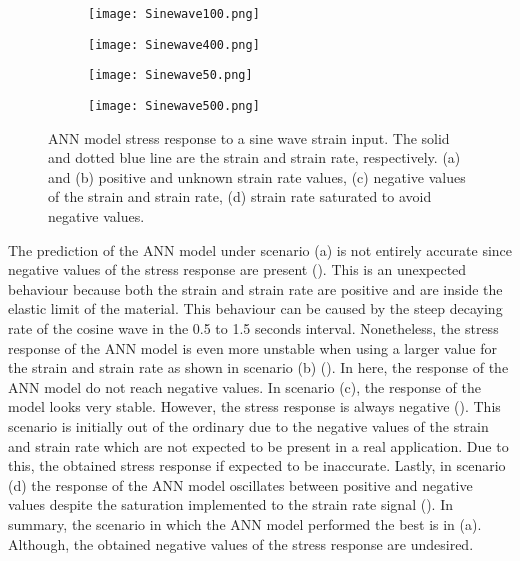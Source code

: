 \begin{figure}[htb!]
	\centering
	\begin{subfigure}[b]{0.49\textwidth}
		\centering
		\texttt{[image: Sinewave100.png]}
		\caption{}
		\label{fig:ANNSineTesta}
	\end{subfigure}
	\begin{subfigure}[b]{0.49\textwidth}
		\centering
		\texttt{[image: Sinewave400.png]}
		\caption{}
		\label{fig:ANNSineTestb}
	\end{subfigure}
	\begin{subfigure}[b]{0.49\textwidth}
		\centering
		\texttt{[image: Sinewave50.png]}
		\caption{}
		\label{fig:ANNSineTestc}
	\end{subfigure}
	\begin{subfigure}[b]{0.49\textwidth}
		\centering
		\texttt{[image: Sinewave500.png]}
		\caption{}
		\label{fig:ANNSineTestd}
	\end{subfigure}
	\caption{ANN model stress response to a sine wave strain input. The solid and dotted blue line are the strain and strain rate, respectively. (a) and (b) positive and unknown strain rate values, (c) negative values of the strain and strain rate, (d) strain rate saturated to avoid negative values.}
	\label{fig:ANNSineTest}
\end{figure}

The prediction of the ANN model under scenario (a) is not entirely accurate since negative values of the stress response are present (). This is an unexpected behaviour because both the strain and strain rate are positive and are inside the elastic limit of the material. This behaviour can be caused by the steep decaying rate of the cosine wave in the 0.5 to 1.5 seconds interval. Nonetheless, the stress response of the ANN model is even more unstable when using a larger value for the strain and strain rate as shown in scenario (b) (). In here, the response of the ANN model do not reach negative values. In scenario (c), the response of the model looks very stable. However, the stress response is always negative (). This scenario is initially out of the ordinary due to the negative values of the strain and strain rate which are not expected to be present in a real application. Due to this, the obtained stress response if expected to be inaccurate. Lastly, in scenario (d) the response of the ANN model oscillates between positive and negative values despite the saturation implemented to the strain rate signal (). In summary, the scenario in which the ANN model performed the best is in (a). Although, the obtained negative values of the stress response are undesired.

